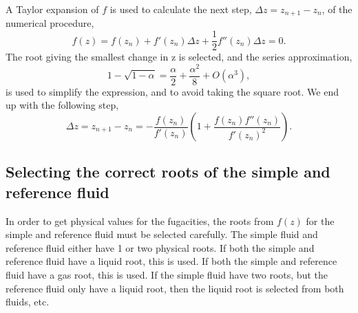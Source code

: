 \documentclass[internal,english]{sintefmemo2012}
\numberwithin{equation}{section}
\begin{document}
A Taylor expansion of $f$ is used to calculate the next step, $\Delta
z = z_{n+1} - z_n $, of the numerical procedure,
\begin{equation}
\label{eq:LK_z_fun_taylor}
f(z) = f(z_n) + f'(z_n)\Delta z + \frac{1}{2}f''(z_n)\Delta z = 0.
\end{equation}
The root giving the smallest change in z is selected, and the
series approximation,
\begin{equation}
\label{eq:LK_sqrt_series}
1 - \sqrt{1 - \alpha} = \frac{\alpha}{2} + \frac{\alpha^2}{8} + O(\alpha^3),
\end{equation}
is used to simplify the expression, and to avoid taking the square
root. We end up with the following step,
\begin{equation}
\label{eq:LK_z_step}
\Delta z = z_{n+1} - z_{n} = - \frac{f(z_{n})}{f'(z_{n})}\left(1+\frac{f(z_{n})f''(z_{n})}{f'(z_{n})^2}\right).
\end{equation}

\subsection{Selecting the correct roots of the simple and reference fluid}
In order to get physical values for the fugacities, the roots from
$f(z)$ for the simple and reference fluid must be selected
carefully. The simple fluid and reference fluid either have 1 or two
physical roots. If both the simple and reference fluid have a liquid
root, this is used. If both the simple and reference fluid have a gas
root, this is used. If the simple fluid have two roots, but the
reference fluid only have a liquid root, then the liquid root is
selected from both fluids, etc. 
\end{document}
